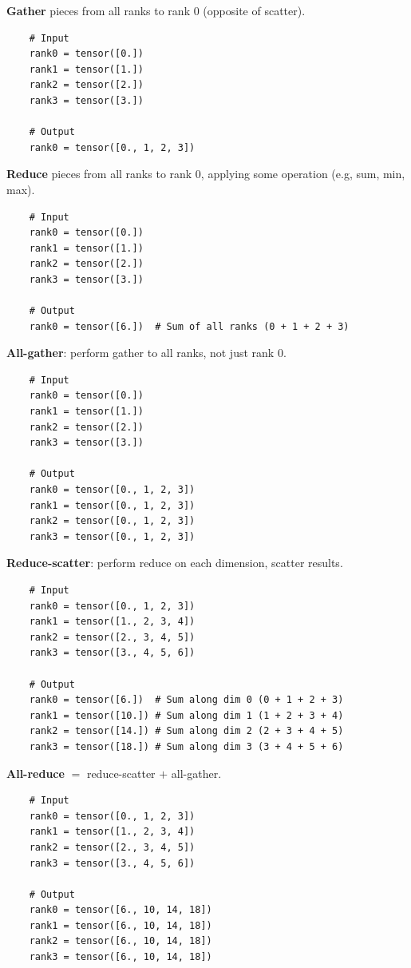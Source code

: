 \documentclass[12pt,twoside]{article}
\begin{document}
\textbf{Gather} pieces from all ranks to rank 0 (opposite of scatter).

\begin{verbatim}
    # Input
    rank0 = tensor([0.])
    rank1 = tensor([1.])
    rank2 = tensor([2.])
    rank3 = tensor([3.])
    
    # Output
    rank0 = tensor([0., 1, 2, 3])
\end{verbatim}

\textbf{Reduce} pieces from all ranks to rank 0, applying some operation (e.g, sum, min, max).

\begin{verbatim}
    # Input
    rank0 = tensor([0.])
    rank1 = tensor([1.])
    rank2 = tensor([2.])
    rank3 = tensor([3.])
    
    # Output
    rank0 = tensor([6.])  # Sum of all ranks (0 + 1 + 2 + 3)
\end{verbatim}

\textbf{All-gather}: perform gather to all ranks, not just rank 0.

\begin{verbatim}
    # Input
    rank0 = tensor([0.])
    rank1 = tensor([1.])
    rank2 = tensor([2.])
    rank3 = tensor([3.])
    
    # Output
    rank0 = tensor([0., 1, 2, 3])
    rank1 = tensor([0., 1, 2, 3])
    rank2 = tensor([0., 1, 2, 3])
    rank3 = tensor([0., 1, 2, 3])
\end{verbatim}

\textbf{Reduce-scatter}: perform reduce on each dimension, scatter results.

\begin{verbatim}
    # Input
    rank0 = tensor([0., 1, 2, 3])
    rank1 = tensor([1., 2, 3, 4])
    rank2 = tensor([2., 3, 4, 5])
    rank3 = tensor([3., 4, 5, 6])
    
    # Output
    rank0 = tensor([6.])  # Sum along dim 0 (0 + 1 + 2 + 3)
    rank1 = tensor([10.]) # Sum along dim 1 (1 + 2 + 3 + 4)
    rank2 = tensor([14.]) # Sum along dim 2 (2 + 3 + 4 + 5)
    rank3 = tensor([18.]) # Sum along dim 3 (3 + 4 + 5 + 6)
\end{verbatim}

\textbf{All-reduce} \(=\) reduce-scatter \(+\) all-gather.

\begin{verbatim}
    # Input
    rank0 = tensor([0., 1, 2, 3])
    rank1 = tensor([1., 2, 3, 4])
    rank2 = tensor([2., 3, 4, 5])
    rank3 = tensor([3., 4, 5, 6])
    
    # Output
    rank0 = tensor([6., 10, 14, 18])
    rank1 = tensor([6., 10, 14, 18])
    rank2 = tensor([6., 10, 14, 18])
    rank3 = tensor([6., 10, 14, 18])
\end{verbatim}
\end{document}
